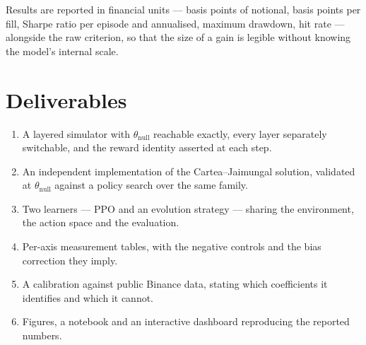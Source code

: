 \documentclass[11pt,a4paper]{article}
\newcommand{\thnull}{\theta_{\mathrm{null}}}
\begin{document}
Results are reported in financial units --- basis points of notional, basis points
per fill, Sharpe ratio per episode and annualised, maximum drawdown, hit rate ---
alongside the raw criterion, so that the size of a gain is legible without knowing
the model's internal scale.

\section{Deliverables}

\begin{enumerate}[label=\arabic*.]
\item A layered simulator with $\thnull$ reachable exactly, every layer separately
  switchable, and the reward identity asserted at each step.
\item An independent implementation of the Cartea--Jaimungal solution, validated
  at $\thnull$ against a policy search over the same family.
\item Two learners --- PPO and an evolution strategy --- sharing the environment,
  the action space and the evaluation.
\item Per-axis measurement tables, with the negative controls and the bias
  correction they imply.
\item A calibration against public Binance data, stating which coefficients it
  identifies and which it cannot.
\item Figures, a notebook and an interactive dashboard reproducing the reported
  numbers.
\end{enumerate}
\end{document}
